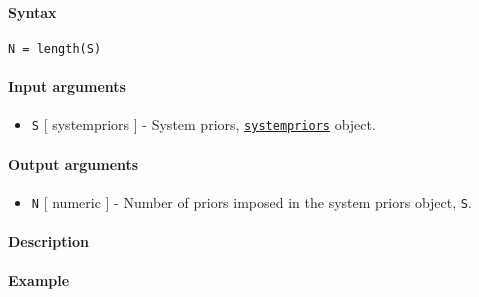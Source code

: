 


	\paragraph{Syntax}\label{syntax}

\begin{verbatim}
N = length(S)
\end{verbatim}

\paragraph{Input arguments}\label{input-arguments}

\begin{itemize}
\itemsep1pt\parskip0pt
\item
  \texttt{S} {[} systempriors {]} - System priors,
  \href{systempriors/Contents}{\texttt{systempriors}} object.
\end{itemize}

\paragraph{Output arguments}\label{output-arguments}

\begin{itemize}
\itemsep1pt\parskip0pt
\item
  \texttt{N} {[} numeric {]} - Number of priors imposed in the system
  priors object, \texttt{S}.
\end{itemize}

\paragraph{Description}\label{description}

\paragraph{Example}\label{example}


